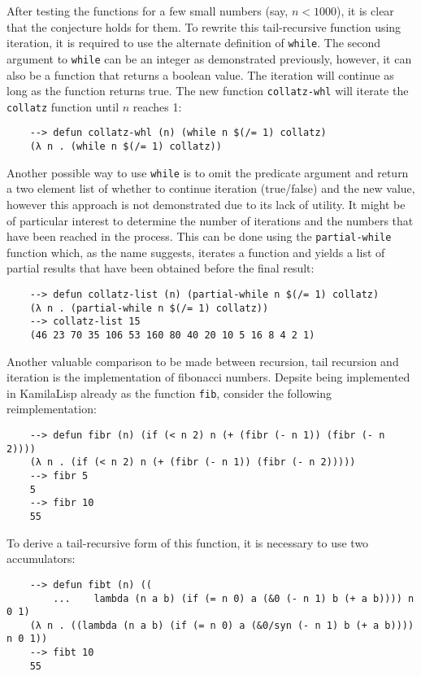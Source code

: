 After testing the functions for a few small numbers (say, $n < 1000$), it is clear that the conjecture holds for them. To rewrite this tail-recursive function using iteration, it is required to use the alternate definition of \verb|while|. The second argument to \verb|while| can be an integer as demonstrated previously, however, it can also be a function that returns a boolean value. The iteration will continue as long as the function returns true. The new function \verb|collatz-whl| will iterate the \verb|collatz| function until $n$ reaches 1:

\begin{Verbatim}
    --> defun collatz-whl (n) (while n $(/= 1) collatz)
    (λ n . (while n $(/= 1) collatz))
\end{Verbatim}

Another possible way to use \verb|while| is to omit the predicate argument and return a two element list of whether to continue iteration (true/false) and the new value, however this approach is not demonstrated due to its lack of utility. It might be of particular interest to determine the number of iterations and the numbers that have been reached in the process. This can be done using the \verb|partial-while| function which, as the name suggests, iterates a function and yields a list of partial results that have been obtained before the final result:

\begin{Verbatim}
    --> defun collatz-list (n) (partial-while n $(/= 1) collatz)
    (λ n . (partial-while n $(/= 1) collatz))
    --> collatz-list 15
    (46 23 70 35 106 53 160 80 40 20 10 5 16 8 4 2 1)
\end{Verbatim}

Another valuable comparison to be made between recursion, tail recursion and iteration is the implementation of fibonacci numbers. Depsite being implemented in KamilaLisp already as the function \verb|fib|, consider the following reimplementation:

\begin{Verbatim}
    --> defun fibr (n) (if (< n 2) n (+ (fibr (- n 1)) (fibr (- n 2))))
    (λ n . (if (< n 2) n (+ (fibr (- n 1)) (fibr (- n 2)))))
    --> fibr 5
    5
    --> fibr 10
    55
\end{Verbatim}

To derive a tail-recursive form of this function, it is necessary to use two accumulators:

\begin{Verbatim}
    --> defun fibt (n) ((
        ...    lambda (n a b) (if (= n 0) a (&0 (- n 1) b (+ a b)))) n 0 1)
    (λ n . ((lambda (n a b) (if (= n 0) a (&0/syn (- n 1) b (+ a b)))) n 0 1))
    --> fibt 10
    55
\end{Verbatim}

